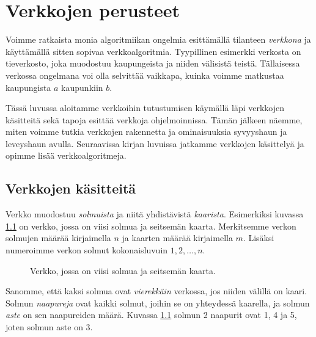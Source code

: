 \chapter{Verkkojen perusteet}

Voimme ratkaista monia algoritmiikan ongelmia
esittämällä tilanteen \emph{verkkona} ja käyttämällä sitten
sopivaa verkkoalgoritmia.
Tyypillinen esimerkki verkosta on tieverkosto,
joka muodostuu kaupungeista ja niiden välisistä teistä.
Tällaisessa verkossa ongelmana voi olla selvittää vaikkapa,
kuinka voimme matkustaa kaupungista $a$ kaupunkiin $b$.

Tässä luvussa aloitamme verkkoihin tutustumisen
käymällä läpi verkkojen käsitteitä sekä tapoja
esittää verkkoja ohjelmoinnissa.
Tämän jälkeen näemme, miten voimme tutkia verkkojen rakennetta
ja ominaisuuksia syvyyshaun ja leveyshaun avulla.
Seuraavissa kirjan luvuissa jatkamme verkkojen käsittelyä ja
opimme lisää verkkoalgoritmeja.

\section{Verkkojen käsitteitä}

Verkko muodostuu \emph{solmuista} ja
niitä yhdistävistä \emph{kaarista}.
Esimerkiksi kuvassa \ref{fig:veresi} on verkko,
jossa on viisi solmua ja seitsemän kaarta.
Merkitsemme verkon solmujen
määrää kirjaimella $n$ ja kaarten määrää
kirjaimella $m$.
Lisäksi numeroimme verkon solmut kokonaisluvuin
$1,2,\dots,n$.

\begin{figure}
\center
\begin{center}
\end{center}
\caption{Verkko, jossa on viisi solmua ja seitsemän kaarta.}
\label{fig:veresi}
\end{figure}

Sanomme, että kaksi solmua ovat \emph{vierekkäin} verkossa,
jos niiden välillä on kaari.
Solmun \emph{naapureja} ovat kaikki solmut,
joihin se on yhteydessä kaarella,
ja solmun \emph{aste} on sen naapureiden määrä.
Kuvassa \ref{fig:veresi} solmun 2 naapurit ovat 1, 4 ja 5,
joten solmun aste on 3.


